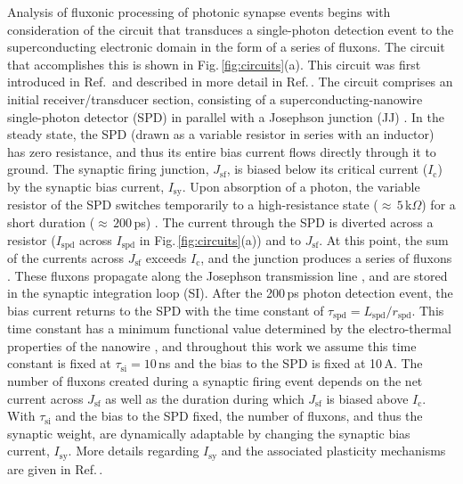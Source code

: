 \documentclass[twocolumn]{article}
\begin{document}
Analysis of fluxonic processing of photonic synapse events begins with consideration of the circuit that transduces a single-photon detection event to the superconducting electronic domain in the form of a series of fluxons. The circuit that accomplishes this is shown in Fig.\,\ref{fig:circuits}(a). This circuit was first introduced in Ref.\,\cite{sh2018} and described in more detail in Ref.\,\cite{sh2018_full}. The circuit comprises an initial receiver/transducer section, consisting of a superconducting-nanowire single-photon detector (SPD) \cite{gook2001,nata2012,liyo2013,mave2013} in parallel with a Josephson junction (JJ) \cite{ti1996,vatu1998,ka1999}. In the steady state, the SPD (drawn as a variable resistor in series with an inductor) has zero resistance, and thus its entire bias current flows directly through it to ground. The synaptic firing junction, $J_{\mathrm{sf}}$, is biased below its critical current ($I_{\mathrm{c}}$) by the synaptic bias current, $I_{\mathrm{sy}}$. Upon absorption of a photon, the variable resistor of the SPD switches temporarily to a high-resistance state ($\approx\,5$\,k$\Omega$) for a short duration ($\approx\,200$\,ps) \cite{yake2007}. The current through the SPD is diverted across a resistor ($I_{\mathrm{spd}}$ across $I_{\mathrm{spd}}$ in Fig.\,\ref{fig:circuits}(a)) and to $J_{\mathrm{sf}}$. At this point, the sum of the currents across $J_{\mathrm{sf}}$ exceeds $I_{\mathrm{c}}$, and the junction produces a series of fluxons \cite{ti1996,vatu1998,ka1999}. These fluxons propagate along the Josephson transmission line \cite{vatu1998,ka1999}, and are stored in the synaptic integration loop (SI). After the 200\,ps photon detection event, the bias current returns to the SPD with the time constant of $\tau_{\mathrm{spd}} = L_{\mathrm{spd}}/r_{\mathrm{spd}}$. This time constant has a minimum functional value determined by the electro-thermal properties of the nanowire \cite{yake2007}, and throughout this work we assume this time constant is fixed at $\tau_{\mathrm{si}} = 10$\,ns and the bias to the SPD is fixed at 10\,\textmu A. The number of fluxons created during a synaptic firing event depends on the net current across $J_{\mathrm{sf}}$ as well as the duration during which $J_{\mathrm{sf}}$ is biased above $I_{\mathrm{c}}$. With $\tau_{\mathrm{si}}$ and the bias to the SPD fixed, the number of fluxons, and thus the synaptic weight, are dynamically adaptable by changing the synaptic bias current, $I_{\mathrm{sy}}$. More details regarding $I_{\mathrm{sy}}$ and the associated plasticity mechanisms are given in Ref.\,\cite{sh2018_full}. 
\end{document}
